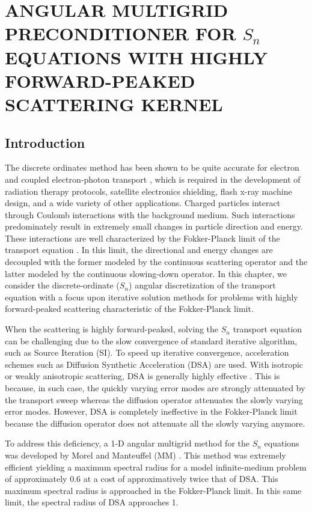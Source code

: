 \chapter{\uppercase{Angular Multigrid Preconditioner for $S_n$ equations with Highly
Forward-Peaked Scattering Kernel}}
\section{Introduction}
The discrete ordinates method has been shown to be quite accurate for electron
and coupled electron-photon transport \cite{accuracy_2,morel_81,accuracy_1}, 
which is required in the development of radiation therapy protocols, satellite 
electronics shielding, flash x-ray machine design, and a wide variety of other 
applications. Charged particles interact through Coulomb interactions with the 
background medium. Such interactions predominately result in extremely small changes 
in particle direction and energy. These interactions are well characterized by the
Fokker-Planck limit of the transport equation \cite{fp_limit,morel_96}. In this 
limit, the directional and energy changes are decoupled with the former modeled 
by the continuous scattering operator and the latter modeled by the continuous 
slowing-down operator. In this chapter, we consider the discrete-ordinate ($S_n$) 
angular discretization of the transport equation with a focus upon iterative 
solution methods for problems with highly forward-peaked scattering characteristic 
of the Fokker-Planck limit. 

When the scattering is highly forward-peaked, solving the $S_n$ transport
equation can be challenging due to the slow convergence of standard iterative
algorithm, such as Source Iteration (SI). To speed up iterative convergence,
acceleration schemes such as Diffusion Synthetic Acceleration (DSA) are used.
With isotropic or weakly anisotropic scattering, DSA is generally highly
effective \cite{dsa_ref}. This is because, in such case, the quickly varying
error modes are strongly attenuated by the transport sweep whereas the
diffusion operator attenuates the slowly varying error modes. However, DSA is
completely ineffective in the Fokker-Planck limit \cite{multigrid_1d} because
the diffusion operator does not attenuate all the slowly varying anymore.

To address this deficiency, a 1-D angular multigrid method for the $S_n$
equations was developed by Morel and Manteuffel (MM) \cite{multigrid_1d}. This
method was extremely efficient yielding a maximum spectral radius for 
a model infinite-medium problem of approximately 0.6 at a cost of
approximatively twice that of DSA. This maximum spectral radius is approached
in the Fokker-Planck limit. In this same limit, the spectral radius of DSA
approaches 1. 

